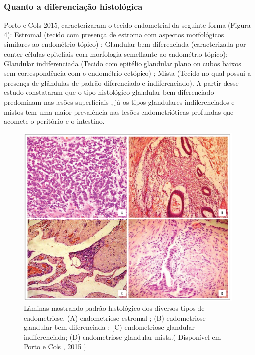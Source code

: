 \documentclass[12pt]{article} %
\begin{document}
\subsubsection{Quanto a diferenciação histológica}

Porto e Cols 2015, caracterizaram o tecido endometrial da seguinte forma (Figura 4): Estromal (tecido com presença de estroma com aspectos morfológicos similares ao endométrio tópico) ; Glandular bem diferenciada (caracterizada por conter células epiteliais com morfologia semelhante ao endométrio tópico); Glandular indiferenciada (Tecido com epitélio glandular plano ou cubos baixos sem correspondência com o endométrio ectópico) ; Mista (Tecido no qual possui a presença de glândulas de padrão diferenciado e indiferenciado). A partir desse estudo constataram que o tipo histológico glandular bem diferenciado  predominam nas lesões superficiais , já os tipos glandulares indiferenciados e mistos tem uma maior prevalência nas lesões endometrióticas profundas que acomete o peritônio e o intestino.


\begin{figure}[h!]
\includegraphics[width=16cm]{citoendometriose16:36.jpg}
\caption[Amostras histológicas de diversos tipos de endometriose]{Lâminas mostrando padrão histológico dos diversos tipos de endometriose. (A) endometriose estromal ; (B) endometriose glandular bem diferenciada ; (C) endometriose glandular indiferenciada; (D) endometriose glandular mista.( Disponível em Porto e Cols , 2015 )}
\end{figure} 
\end{document}
